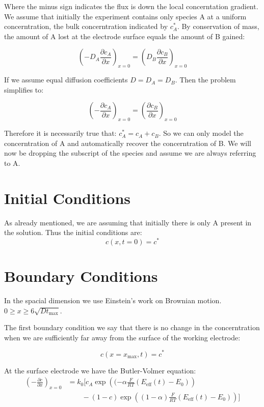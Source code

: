Where the minus sign indicates the flux is down the local
concerntation gradient. We assume that initially the experiment
contains only species A at a uniform concerntration, the bulk
concerntration indicated by $c^*_A$. By conservation of mass, the
amount of A lost at the electrode surface equals the amount of B gained:

\begin{equation}
  \left( -D_A \frac{\partial c_A}{\partial x} \right)_{x=0}  = \left( D_B
  \frac{\partial c_B}{\partial x} \right)_{x=0}
\end{equation}

If we assume equal diffusion coefficients $D = D_A = D_B$. Then the
problem simplifies to:

\begin{equation}
  \left( - \frac{\partial c_A}{\partial x} \right)_{x=0}  = \left(
  \frac{\partial c_B}{\partial x} \right)_{x=0}
\end{equation}

Therefore it is necessarily true that: $c^*_A = c_A + c_B$. So we can
only model the concerntration of A and automatically recover the
concerntration of B. We will now be dropping the subscript of the
species and assume we are always referring to A.

\section{Initial Conditions}
As already mentioned, we are assuming that initially there is only A
present in the solution. Thus the initial conditions are:
\begin{equation}
  c(x, t = 0) = c^*
\end{equation}

\section{Boundary Conditions}
In the spacial dimension we use Einstein's work on Brownian motion.
$0 \geq x \geq 6 \sqrt{D t_{\text{max}}}$.

The first boundary condition we say that there is no change in the
concerntration when we are sufficiently far away from the surface of
the working electrode:

\begin{equation}
  c(x = x_{\text{max}}, t) = c^*
\end{equation}

At the surface electrode we have the Butler-Volmer equation:
\begin{equation}
  \begin{aligned}
    \left(-\frac{\partial c}{\partial x}\right)_{x=0}
    &= k_0\Bigg[
      c_A\exp\!\left((-\alpha\frac{F}{RT}\left(E_{\mathrm{eff}}(t)-E_0\right)\right)\\
        &\qquad-
        (1-c)\exp\!\left((1-\alpha)\frac{F}{RT}\left(E_{\mathrm{eff}}(t)-E_0\right)\right)
      \Bigg]
    \end{aligned}
  \end{equation}
